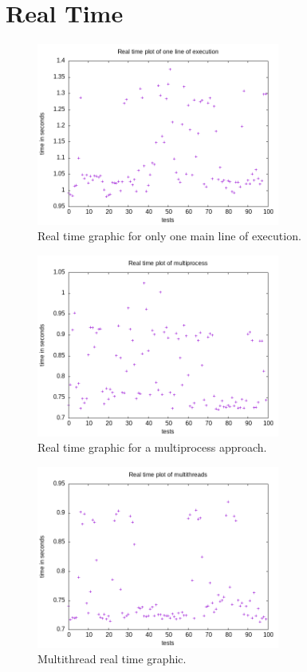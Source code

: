 \documentclass[12pt]{article}
\begin{document}
\section{Real Time}\label{results}
    \begin{figure}[H]
        \caption{Real time graphic for only one main line of execution.}
        \centering
        \includegraphics[width=8cm]{doc/real_simples.png}
    \end{figure}

    \begin{figure}[H]
        \caption{Real time graphic for a multiprocess approach.}
        \centering
        \includegraphics[width=8cm]{doc/real_processos.png}
    \end{figure}

    \begin{figure}[H]
        \caption{Multithread real time graphic.}
        \centering
        \includegraphics[width=8cm]{doc/real_threads.png}
    \end{figure}
\end{document}
